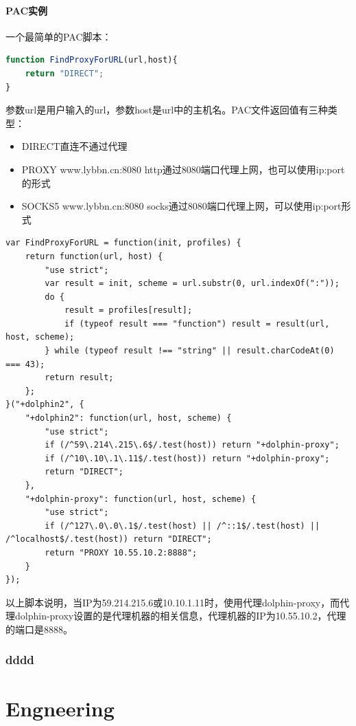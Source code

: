 \documentclass[letter]{book}
\begin{document}
\subsection{PAC实例}

一个最简单的PAC脚本：

\begin{lstlisting}[language=JavaScript]
function FindProxyForURL(url,host){
	return "DIRECT";
}
\end{lstlisting}

参数url是用户输入的url，参数host是url中的主机名。PAC文件返回值有三种类型：

\begin{itemize}
	\item{DIRECT直连不通过代理}
	\item{PROXY www.lybbn.cn:8080 http通过8080端口代理上网，也可以使用ip:port的形式}
	\item{SOCKS5 www.lybbn.cn:8080 socks通过8080端口代理上网，可以使用ip:port形式}
\end{itemize}

\begin{lstlisting}[language=VBScript]
var FindProxyForURL = function(init, profiles) {
	return function(url, host) {
		"use strict";
		var result = init, scheme = url.substr(0, url.indexOf(":"));
		do {
			result = profiles[result];
			if (typeof result === "function") result = result(url, host, scheme);
		} while (typeof result !== "string" || result.charCodeAt(0) === 43);
		return result;
	};
}("+dolphin2", {
	"+dolphin2": function(url, host, scheme) {
		"use strict";
		if (/^59\.214\.215\.6$/.test(host)) return "+dolphin-proxy";
		if (/^10\.10\.1\.11$/.test(host)) return "+dolphin-proxy";
		return "DIRECT";
	},
	"+dolphin-proxy": function(url, host, scheme) {
		"use strict";
		if (/^127\.0\.0\.1$/.test(host) || /^::1$/.test(host) || /^localhost$/.test(host)) return "DIRECT";
		return "PROXY 10.55.10.2:8888";
	}
});
\end{lstlisting}

以上脚本说明，当IP为59.214.215.6或10.10.1.11时，使用代理dolphin-proxy，而代理dolphin-proxy设置的是代理机器的相关信息，代理机器的IP为10.55.10.2，代理的端口是8888。

\section{dddd}


\part{Engneering}
\end{document}
